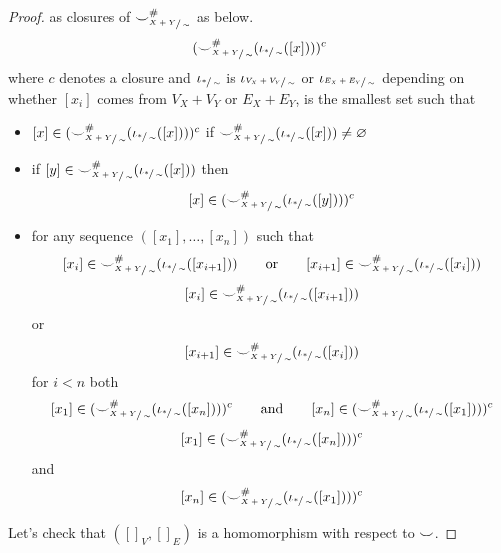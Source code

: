 \begin{proof}
    as closures of ${\smile}^{{\#}}_{\sfrac{X+Y}{\sim}}$ as below.
    \[
      ({\smile}^{{\#}}_{\sfrac{X+Y}{\sim}}(\iota_{\sfrac{*}{\sim}}([x])))^{c}
    \]
    where $c$ denotes a closure and $\iota_{\sfrac{*}{\sim}}$ is $\iota_{\sfrac{V_{X} + V_{Y}}{\sim}}$ or $\iota_{\sfrac{E_{X} + E_{Y}}{\sim}}$ depending on whether $[x_i]$ comes from $V_{X} + V_{Y}$ or $E_{X} + E_{Y}$, is the smallest set such that
    \begin{itemize}
        \item $[x] \in ({\smile}^{{\#}}_{\sfrac{X+Y}{\sim}}(\iota_{\sfrac{*}{\sim}}([x])))^{c}$ if ${\smile}^{{\#}}_{\sfrac{X+Y}{\sim}}(\iota_{\sfrac{*}{\sim}}([x])) \not = \varnothing$
        \item if $[y] \in {\smile}^{{\#}}_{\sfrac{X+Y}{\sim}}(\iota_{\sfrac{*}{\sim}}([x]))$ then 
        \[
            [x] \in ({\smile}^{{\#}}_{\sfrac{X+Y}{\sim}}(\iota_{\sfrac{*}{\sim}}([y])))^{c}
        \]
        \item for any sequence $([x_1], \ldots, [x_n])$ such that
        \ifdefined \ONECOLUMN
        \[[x_i] \in {\smile}^{{\#}}_{\sfrac{X+Y}{\sim}}(\iota_{\sfrac{*}{\sim}}([x_{i+1}])) \qquad \text{or} \qquad [x_{i+1}] \in {\smile}^{{\#}}_{\sfrac{X+Y}{\sim}}(\iota_{\sfrac{*}{\sim}}([x_{i}]))\]
        \else
        \[
            [x_i] \in {\smile}^{{\#}}_{\sfrac{X+Y}{\sim}}(\iota_{\sfrac{*}{\sim}}([x_{i+1}]))
        \] or 
        \[
            [x_{i+1}] \in {\smile}^{{\#}}_{\sfrac{X+Y}{\sim}}(\iota_{\sfrac{*}{\sim}}([x_{i}]))
        \]
        \fi
         for $i < n$ both
        \ifdefined \ONECOLUMN
        \[
            [x_1] \in ({\smile}^{{\#}}_{\sfrac{X+Y}{\sim}}(\iota_{\sfrac{*}{\sim}}([x_{n}])))^{c} \qquad \text{and} \qquad [x_n] \in ({\smile}^{{\#}}_{\sfrac{X+Y}{\sim}}(\iota_{\sfrac{*}{\sim}}([x_{1}])))^{c}
        \]
        \else
         \[
            [x_1] \in ({\smile}^{{\#}}_{\sfrac{X+Y}{\sim}}(\iota_{\sfrac{*}{\sim}}([x_{n}])))^{c}
        \]
        and
        \[
            [x_n] \in ({\smile}^{{\#}}_{\sfrac{X+Y}{\sim}}(\iota_{\sfrac{*}{\sim}}([x_{1}])))^{c}
        \]
        \fi
    \end{itemize}
    Let's check that $([]_{V},[]_{E})$ is a homomorphism with respect to ${\smile}$.

\end{proof}
